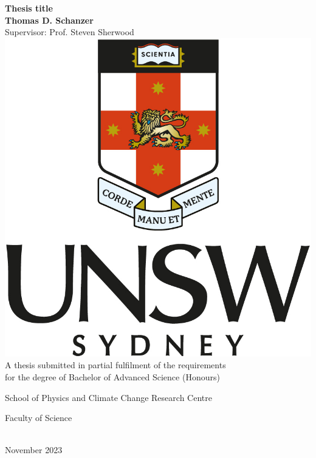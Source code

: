 \documentclass[../main.tex]{subfiles}
\begin{document}
\frontmatter
\begin{titlepage}
\vspace*{\fill}
\begin{center}
    {\Huge \textbf{%
        Thesis title
    }} \\
    \vspace{1.5cm}
    {\Large\textbf{Thomas D. Schanzer}} \\
    \vspace{6pt}
    {\large Supervisor: Prof. Steven Sherwood} \\
    \vfill
    \includegraphics[width=0.3\linewidth]{figures/unsw_logo.jpg} \\
    \vspace{2cm}
    {\large%
         A thesis submitted in partial fulfilment of the requirements \\ for
         the degree of Bachelor of Advanced Science (Honours)
    } \\
    \vspace{0.75cm}
    {\large%
        School of Physics and Climate Change Research Centre

        Faculty of Science
    } \\
    \vspace{0.75cm}
    {\large November 2023}
\end{center}
\end{titlepage}
\end{document}
